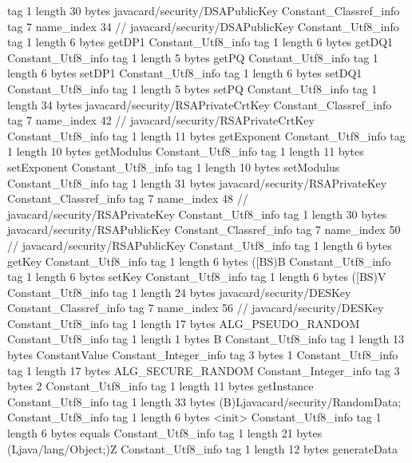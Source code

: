 {{{			tag	1
			length	30
			bytes	javacard/security/DSAPublicKey
		}
		Constant_Classref_info {
			tag	7
			name_index	34		// javacard/security/DSAPublicKey
		}
		Constant_Utf8_info {
			tag	1
			length	6
			bytes	getDP1
		}
		Constant_Utf8_info {
			tag	1
			length	6
			bytes	getDQ1
		}
		Constant_Utf8_info {
			tag	1
			length	5
			bytes	getPQ
		}
		Constant_Utf8_info {
			tag	1
			length	6
			bytes	setDP1
		}
		Constant_Utf8_info {
			tag	1
			length	6
			bytes	setDQ1
		}
		Constant_Utf8_info {
			tag	1
			length	5
			bytes	setPQ
		}
		Constant_Utf8_info {
			tag	1
			length	34
			bytes	javacard/security/RSAPrivateCrtKey
		}
		Constant_Classref_info {
			tag	7
			name_index	42		// javacard/security/RSAPrivateCrtKey
		}
		Constant_Utf8_info {
			tag	1
			length	11
			bytes	getExponent
		}
		Constant_Utf8_info {
			tag	1
			length	10
			bytes	getModulus
		}
		Constant_Utf8_info {
			tag	1
			length	11
			bytes	setExponent
		}
		Constant_Utf8_info {
			tag	1
			length	10
			bytes	setModulus
		}
		Constant_Utf8_info {
			tag	1
			length	31
			bytes	javacard/security/RSAPrivateKey
		}
		Constant_Classref_info {
			tag	7
			name_index	48		// javacard/security/RSAPrivateKey
		}
		Constant_Utf8_info {
			tag	1
			length	30
			bytes	javacard/security/RSAPublicKey
		}
		Constant_Classref_info {
			tag	7
			name_index	50		// javacard/security/RSAPublicKey
		}
		Constant_Utf8_info {
			tag	1
			length	6
			bytes	getKey
		}
		Constant_Utf8_info {
			tag	1
			length	6
			bytes	([BS)B
		}
		Constant_Utf8_info {
			tag	1
			length	6
			bytes	setKey
		}
		Constant_Utf8_info {
			tag	1
			length	6
			bytes	([BS)V
		}
		Constant_Utf8_info {
			tag	1
			length	24
			bytes	javacard/security/DESKey
		}
		Constant_Classref_info {
			tag	7
			name_index	56		// javacard/security/DESKey
		}
		Constant_Utf8_info {
			tag	1
			length	17
			bytes	ALG_PSEUDO_RANDOM
		}
		Constant_Utf8_info {
			tag	1
			length	1
			bytes	B
		}
		Constant_Utf8_info {
			tag	1
			length	13
			bytes	ConstantValue
		}
		Constant_Integer_info {
			tag	3
			bytes	1
		}
		Constant_Utf8_info {
			tag	1
			length	17
			bytes	ALG_SECURE_RANDOM
		}
		Constant_Integer_info {
			tag	3
			bytes	2
		}
		Constant_Utf8_info {
			tag	1
			length	11
			bytes	getInstance
		}
		Constant_Utf8_info {
			tag	1
			length	33
			bytes	(B)Ljavacard/security/RandomData;
		}
		Constant_Utf8_info {
			tag	1
			length	6
			bytes	<init>
		}
		Constant_Utf8_info {
			tag	1
			length	6
			bytes	equals
		}
		Constant_Utf8_info {
			tag	1
			length	21
			bytes	(Ljava/lang/Object;)Z
		}
		Constant_Utf8_info {
			tag	1
			length	12
			bytes	generateData
}}}
